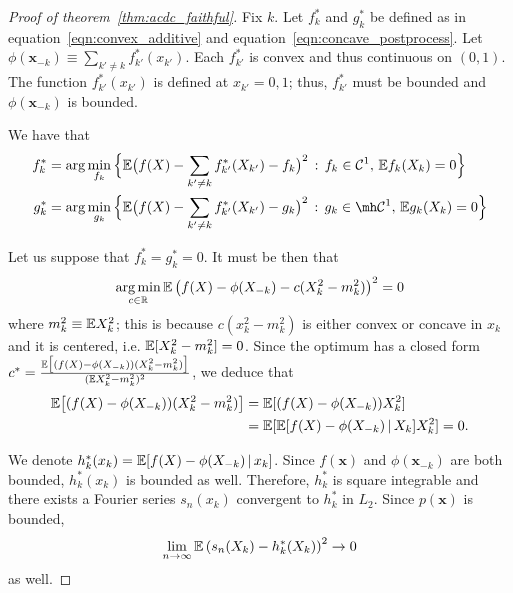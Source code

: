 \begin{proof}[Proof of theorem~\ref{thm:acdc_faithful}]

Fix $k$. Let $f^*_k$ and $g^*_k$ be defined as in
equation~\ref{eqn:convex_additive} and
equation~\ref{eqn:concave_postprocess}. Let $\phi(\mathbf{x}_{-k})
\equiv \sum_{k' \neq k} f^*_{k'}(x_{k'})$. Each $f^*_{k'}$ is convex
and thus continuous on $(0,1)$. The function $f^*_{k'}(x_{k'})$ is defined at
$x_{k'} = 0,1$; thus, $f^*_{k'}$ must be bounded and
$\phi(\mathbf{x}_{-k})$ is bounded.

We have that
\begin{align}
f^*_k &= \arg\min_{f_k} \Big\{
   \E\big( f(X) - \sum_{k' \neq k} f^*_{k'}(X_{k'}) - f_k \big)^2 
    \,:\, f_k \in  \mathcal{C}^1,\, \E f_k(X_k) = 0 
  \Big\} \\
g^*_k &= \arg\min_{g_k} \Big\{
   \E\big( f(X) - \sum_{k' \neq k} f^*_{k'}(X_{k'}) - g_k \big)^2 
    \,:\, g_k \in \mh \mathcal{C}^1,\, \E g_k(X_k) = 0 
  \Big\}
\end{align}

Let us suppose that $f^*_k = g^*_k = 0$. It must be then that
\begin{align*}
\mathop{\text{\rm arg\,min}}_{c \in {\mathbb R}} {\mathbb E} \left( f(X) - \phi(X_{-k}) - c (X_k^2 - m_k^2) \right)^2 = 0
\end{align*}
where $m_k^2 \equiv {\mathbb E} X_k^2$; this is because $c(x_k^2 - m_k^2)$ is either convex or concave in $x_k$ and it is centered, i.e. ${\mathbb E}[ X_k^2 - m_k^2] = 0$. Since the optimum has a closed form $c^* = \frac{{\mathbb E}\big[(f(X) -\phi(X_{-k}))(X_k^2 - m^2_k)\big]}{({\mathbb E} X_k^2 - m^2_k)^2}$, we deduce that 
\begin{align*}
{\mathbb E} \big[ (f(X) - \phi(X_{-k})) (X_k^2 - m_k^2) \big] 
   &= {\mathbb E}[ (f(X) - \phi(X_{-k})) X^2_k] \\
&= {\mathbb E}[ {\mathbb E}[ f(X) - \phi(X_{-k}) {\,|\,} X_k] X^2_k] = 0.
\end{align*}

We denote $h^*_k(x_k) = {\mathbb E}[ f(X) - \phi(X_{-k}) {\,|\,}
  x_k]$.  Since $f(\mathbf{x})$ and $\phi(\mathbf{x}_{-k})$ are both bounded,
$h^*_k(x_k)$ is bounded as well. Therefore, $h^*_k$ is square
integrable and there exists a Fourier series $s_n(x_k)$ convergent to
$h^*_k$ in $L_2$. Since $p(\mathbf{x})$ is bounded, $$\lim_{n
  \rightarrow \infty} {\mathbb E} \left( s_n(X_k) - h^*_k(X_k ) \right)^2
\rightarrow 0$$ as well.



\end{proof}
